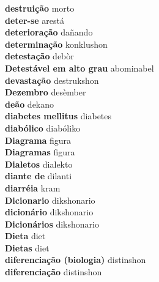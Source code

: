 \textbf{ destruição  } morto \\
\textbf{ deter-se  } arestá \\
\textbf{ deterioração  } dañando \\
\textbf{ determinação  } konklushon \\
\textbf{ detestação  } debòr \\
\textbf{ Detestável em alto grau  } abominabel \\
\textbf{ devastação  } destrukshon \\
\textbf{ Dezembro  } desèmber \\
\textbf{ deão  } dekano \\
\textbf{ diabetes mellitus  } diabetes \\
\textbf{ diabólico  } diabóliko \\
\textbf{ Diagrama  } figura \\
\textbf{ Diagramas  } figura \\
\textbf{ Dialetos  } dialekto \\
\textbf{ diante de  } dilanti \\
\textbf{ diarréia  } kram \\
\textbf{ Dicionario  } dikshonario \\
\textbf{ dicionário  } dikshonario \\
\textbf{ Dicionários  } dikshonario \\
\textbf{ Dieta  } diet \\
\textbf{ Dietas  } diet \\
\textbf{ diferenciação (biologia)  } distinshon \\
\textbf{ diferenciação  } distinshon \\
